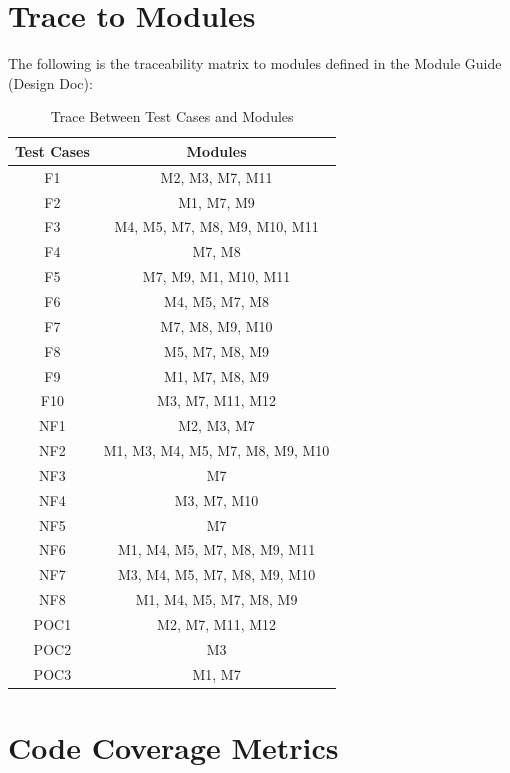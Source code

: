 \documentclass[12pt, titlepage]{article}
\begin{document}
\section{Trace to Modules}		
\noindent The following is the traceability matrix to modules defined in the Module Guide (Design Doc):
\begin{center}
\begin{table}[H]
\centering
\begin{tabular}{ |c| c| }\hline

 \textbf{Test Cases}    & \textbf{Modules}  \\ \hline
 F1   & M2, M3, M7, M11  \\ \hline
 F2   & M1, M7, M9  \\ \hline
 F3   & M4, M5, M7, M8, M9, M10, M11  \\ \hline
 F4   & M7, M8  \\ \hline
 F5   & M7, M9, M1, M10, M11  \\ \hline
 F6   & M4, M5, M7, M8  \\ \hline
 F7   & M7, M8, M9, M10  \\ \hline
 F8   & M5, M7, M8, M9  \\ \hline
 F9   & M1, M7, M8, M9  \\ \hline
 F10  & M3, M7, M11, M12  \\ \hline
 
 NF1  & M2, M3, M7  \\ \hline
 NF2  & M1, M3, M4, M5, M7, M8, M9, M10  \\ \hline
 NF3  & M7  \\ \hline
 NF4  & M3, M7, M10  \\ \hline
 NF5  & M7  \\ \hline
 NF6  & M1, M4, M5, M7, M8, M9, M11  \\ \hline
 NF7  & M3, M4, M5, M7, M8, M9, M10  \\ \hline
 NF8  & M1, M4, M5, M7, M8, M9  \\ \hline
 
 POC1 & M2, M7, M11, M12  \\ \hline
 POC2 & M3   \\ \hline
 POC3 & M1, M7  \\ \hline 
 
\end{tabular}
\caption{Trace Between Test Cases and Modules}
\end{table}
\end{center}


\section{Code Coverage Metrics}
\end{document}
